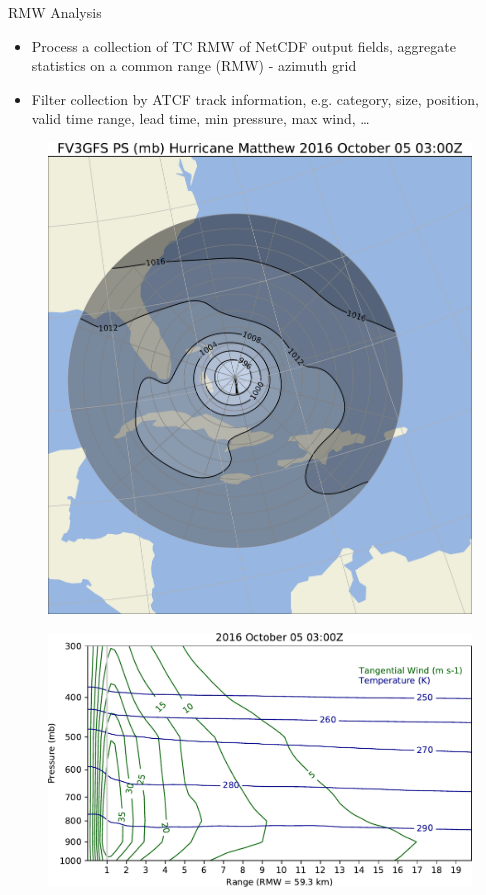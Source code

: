 \documentclass[final]{beamer}
\newlength{\onecolwid}
\newlength{\twocolwid}
\begin{document}
\begin{frame}[t]
\begin{columns}[t]
\begin{column}{\twocolwid}
\begin{columns}[t,totalwidth=\twocolwid]
\begin{column}{\onecolwid}
\begin{block}{RMW Analysis}
\begin{itemize}
\item Process a collection of TC RMW of NetCDF output fields,
aggregate statistics on a common range (RMW) - azimuth grid
\item Filter collection by ATCF track information, e.g. category, size,
position, valid time range, lead time, min pressure, max wind, \ldots
\end{itemize}
\vspace{1in}
\begin{figure}
\includegraphics[width=1.0\linewidth]{../plots/PRMSL_2016100503.pdf}
\end{figure}
\begin{figure}
\includegraphics[width=1.0\linewidth]{../plots/cross_section_2016100503.pdf}
\end{figure}


\end{block}
\end{column}
\end{columns}
\end{column}
\end{columns}
\end{frame}
\end{document}
